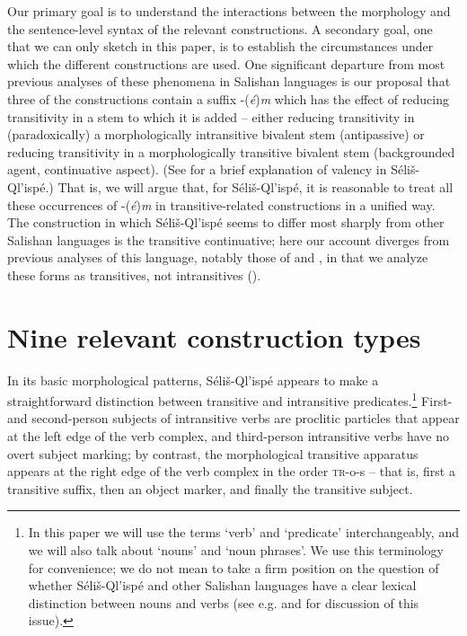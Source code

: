 \documentclass[output=paper,colorlinks,citecolor=brown]{langscibook}
\begin{document}
  Our primary goal is to understand the interactions between the
  morphology and the sentence-level syntax of the relevant
  constructions.  A secondary goal, one that we can only sketch in
  this paper, is to establish the circumstances under which the
  different constructions are used.  One significant departure from
  most previous analyses of these phenomena in Salishan languages is
  our proposal that three of the constructions contain a suffix
  -(\emph{\'e})\emph{m} which has the effect of reducing transitivity
  in a stem to which it is added -- either reducing transitivity in
  (paradoxically) a morphologically intransitive bivalent stem
  (antipassive) or reducing transitivity in a morphologically
  transitive bivalent stem (backgrounded agent, continuative aspect).
  (See  for a brief explanation of valency in
  S\'eli\v{s}-Ql'isp\'e.) That is, we will argue that, for
  S\'eli\v{s}-Ql'isp\'e, it is reasonable to treat all these
  occurrences of -(\emph{\'e})\emph{m} in transitive-related
  constructions in a unified way.  The construction in which
  S\'eli\v{s}-Ql'isp\'e seems to differ most sharply from other
  Salishan languages is the transitive continuative; here our account
  diverges from previous analyses of this language, notably those of
  \citet{Kroeber:1999} and \citet{Vogt:1940}, in
  that we analyze these
  forms as transitives, not intransitives ().

\section{Nine relevant construction types}
\label{thomason_section_2}
In its basic morphological patterns, S\'eli\v{s}-Ql'isp\'e appears to
make a straightforward distinction between transitive and intransitive
predicates.\footnote{In this paper we will use the terms `verb' and
`predicate' interchangeably, and we will also talk about `nouns' and
`noun phrases'.  We use this terminology for convenience; we do not
mean to take a firm position on the question of whether
S\'eli\v{s}-Ql'isp\'e and other Salishan languages have a clear
lexical distinction between nouns and verbs (see e.g. \citealt{Kinkade:1983} and
\citealt{vanEijk&Hess:1986} for discussion of this issue).}  First- and
second\hyp person subjects of intransitive verbs are proclitic particles
that appear at the left edge of the verb complex, and third-person
intransitive verbs have no overt subject marking; by contrast, the
morphological transitive apparatus appears at the right edge of the
verb complex in the order \textsc{tr}-o-s -- that is, first a
transitive suffix, then an object marker, and finally the transitive
subject.
\end{document}
